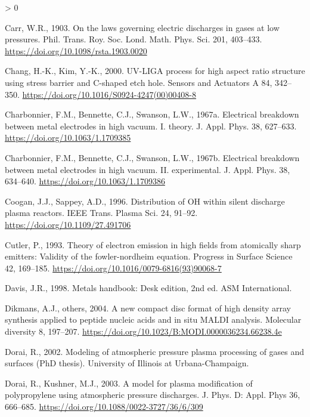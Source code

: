 \documentclass[
  11pt,
  twoside]{article}
\newlength{\cslhangindent}
\newenvironment{CSLReferences}[2] %
 {%
  \setlength{\parindent}{0pt}
  \ifodd #1 \everypar{\setlength{\hangindent}{\cslhangindent}}\ignorespaces\fi
  \ifnum #2 > 0
  \setlength{\parskip}{#2\baselineskip}
  \fi
 }%
 {}
\begin{document}
\begin{CSLReferences}{1}{0}
\leavevmode\hypertarget{ref-Carr1903}{}%
Carr, W.R., 1903. On the laws governing electric discharges in gases at low pressures. Phil. Trans. Roy. Soc. Lond. Math. Phys. Sci. 201, 403--433. \url{https://doi.org/10.1098/rsta.1903.0020}

\leavevmode\hypertarget{ref-Chang00}{}%
Chang, H.-K., Kim, Y.-K., 2000. {UV-LIGA process for high aspect ratio structure using stress barrier and C-shaped etch hole}. Sensors and Actuators A 84, 342--350. \url{https://doi.org/10.1016/S0924-4247(00)00408-8}

\leavevmode\hypertarget{ref-Char1967}{}%
Charbonnier, F.M., Bennette, C.J., Swanson, L.W., 1967a. Electrical breakdown between metal electrodes in high vacuum. I. theory. J. Appl. Phys. 38, 627--633. \url{https://doi.org/10.1063/1.1709385}

\leavevmode\hypertarget{ref-Char1967-2}{}%
Charbonnier, F.M., Bennette, C.J., Swanson, L.W., 1967b. Electrical breakdown between metal electrodes in high vacuum. II. experimental. J. Appl. Phys. 38, 634--640. \url{https://doi.org/10.1063/1.1709386}

\leavevmode\hypertarget{ref-Coog1996}{}%
Coogan, J.J., Sappey, A.D., 1996. Distribution of {OH} within silent discharge plasma reactors. IEEE Trans. Plasma Sci. 24, 91--92. \url{https://doi.org/10.1109/27.491706}

\leavevmode\hypertarget{ref-Cutl1993}{}%
Cutler, P., 1993. Theory of electron emission in high fields from atomically sharp emitters: Validity of the fowler-nordheim equation. Progress in Surface Science 42, 169--185. \url{https://doi.org/10.1016/0079-6816(93)90068-7}

\leavevmode\hypertarget{ref-Davi1998}{}%
Davis, J.R., 1998. Metals handbook: Desk edition, 2nd ed. ASM International.

\leavevmode\hypertarget{ref-Dikm04}{}%
Dikmans, A.J., others, 2004. A new compact disc format of high density array synthesis applied to peptide nucleic acids and in situ {MALDI} analysis. Molecular diversity 8, 197--207. \url{https://doi.org/10.1023/B:MODI.0000036234.66238.4e}

\leavevmode\hypertarget{ref-Dora02}{}%
Dorai, R., 2002. Modeling of atmospheric pressure plasma processing of gases and surfaces (PhD thesis). University of Illinois at Urbana-Champaign.

\leavevmode\hypertarget{ref-Dora03}{}%
Dorai, R., Kushner, M.J., 2003. A model for plasma modification of polypropylene using atmospheric pressure discharges. J. Phys. D: Appl. Phys 36, 666--685. \url{https://doi.org/10.1088/0022-3727/36/6/309}


\end{CSLReferences}
\end{document}
